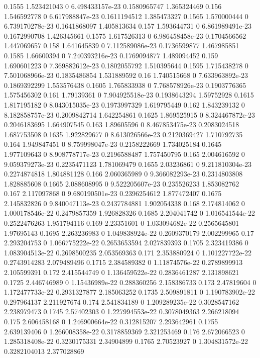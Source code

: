 {0.1555 1.523421043 0 6.498433157e-23 0.1580965747 1.365324469
0.156 1.546592778 0 6.617988847e-23 0.1611194512 1.385473327
0.1565 1.570000444 0 6.739170278e-23 0.1641868097 1.405813634
0.157 1.593644731 0 6.861989491e-23 0.1672990708 1.426345661
0.1575 1.617526313 0 6.986458458e-23 0.1704566562 1.447069657
0.158 1.641645839 0 7.112589086e-23 0.1736599877 1.467985851
0.1585 1.66600394 0 7.240393216e-23 0.1769094877 1.489094452
0.159 1.690601223 0 7.369882612e-23 0.1802055792 1.510395644
0.1595 1.715438278 0 7.501068966e-23 0.1835486854 1.531889592
0.16 1.740515668 0 7.633963892e-23 0.1869392299 1.553576438
0.1605 1.765833938 0 7.768578926e-23 0.1903776365 1.575456302
0.161 1.79139361 0 7.904925518e-23 0.1938643294 1.59752928
0.1615 1.817195182 0 8.043015035e-23 0.1973997329 1.619795449
0.162 1.843239132 0 8.182858757e-23 0.2009842714 1.642254861
0.1625 1.869525915 0 8.324467872e-23 0.2046183695 1.664907545
0.163 1.89605596 0 8.467853475e-23 0.2083024518 1.687753508
0.1635 1.922829677 0 8.613026566e-23 0.2120369427 1.710792735
0.164 1.949847451 0 8.759998047e-23 0.2158222669 1.734025184
0.1645 1.977109643 0 8.908778717e-23 0.2196588487 1.757450795
0.165 2.004616592 0 9.059379273e-23 0.2235471123 1.781069479
0.1655 2.03236861 0 9.211810304e-23 0.2274874818 1.804881128
0.166 2.060365989 0 9.366082293e-23 0.2314803808 1.828885608
0.1665 2.088608995 0 9.522205607e-23 0.235526233 1.853082762
0.167 2.117097868 0 9.680190501e-23 0.2396254612 1.877472407
0.1675 2.145832826 0 9.840047113e-23 0.2437784881 1.902054338
0.168 2.174814062 0 1.000178546e-22 0.2479857359 1.926828326
0.1685 2.204041742 0 1.016541544e-22 0.2522476263 1.951794116
0.169 2.23351601 0 1.033094682e-22 0.2565645801 1.97695143
0.1695 2.263236983 0 1.049838924e-22 0.2609370179 2.002299965
0.17 2.293204753 0 1.066775222e-22 0.2653653594 2.027839393
0.1705 2.323419386 0 1.083904513e-22 0.2698500235 2.053569363
0.171 2.353880924 0 1.101227722e-22 0.2743914283 2.079489496
0.1715 2.384589382 0 1.11874576e-22 0.2789899913 2.105599391
0.172 2.415544749 0 1.136459522e-22 0.2836461287 2.131898621
0.1725 2.446746989 0 1.15436989e-22 0.288360256 2.158386733
0.173 2.47819604 0 1.172477733e-22 0.2931327877 2.185063252
0.1735 2.509891811 0 1.190783902e-22 0.297964137 2.211927674
0.174 2.541834189 0 1.209289235e-22 0.3028547162 2.238979473
0.1745 2.57402303 0 1.227994553e-22 0.3078049363 2.266218094
0.175 2.606458168 0 1.246900664e-22 0.312815207 2.293642961
0.1755 2.639139406 0 1.266008358e-22 0.3178859369 2.321253469
0.176 2.672066523 0 1.285318408e-22 0.3230175331 2.34904899
0.1765 2.70523927 0 1.304831572e-22 0.3282104013 2.377028869
}
